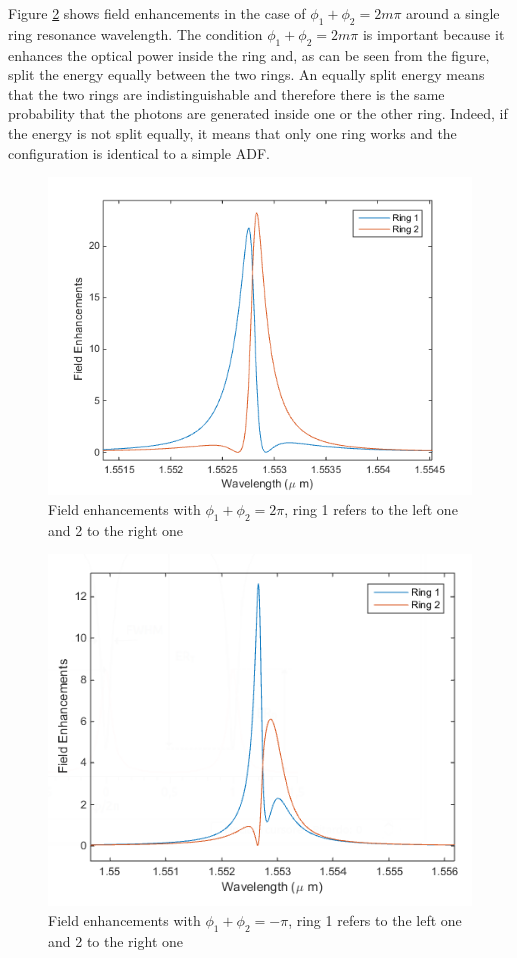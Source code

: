  Figure \ref{FE} shows field enhancements in the case of $\phi_1 + \phi_2 = 2m\pi$ around a single ring resonance wavelength. The condition $\phi_1 + \phi_2 = 2m\pi$ is important because it enhances the optical power inside the ring and, as can be seen from the figure, split the energy equally between the two rings. An equally split energy means that the two rings are indistinguishable and therefore there is the same probability that the photons are generated inside one or the other ring. Indeed, if the energy is not split equally, it means that only one ring works and the configuration is identical to a simple ADF.


\begin{figure}
\centering
\includegraphics[width = .8\textwidth]{img/FE_fase_2pi}
\caption{Field enhancements with $\phi_1+\phi_2 = 2\pi$, ring 1 refers to the left one and 2 to the right one}
\label{FE}
\end{figure}

\begin{figure}
\centering
\includegraphics[width = .8\textwidth]{img/FE_fase_pi}
\caption{Field enhancements with $\phi_1+\phi_2 = -\pi$, ring 1 refers to the left one and 2 to the right one}
\label{FE}
\end{figure}